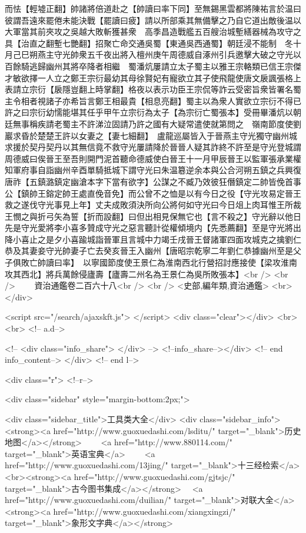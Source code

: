 而怯【輕墟正翻】帥諸將倍道赴之【帥讀曰率下同】至無錫黑雲都將陳祐言於温曰彼謂吾遠來罷倦未能決戰【罷讀曰疲】請以所部乘其無備擊之乃自它道出敵後温以大軍當其前夾攻之吳越大敗斬獲甚衆　高季昌造戰艦五百艘治城塹繕器械為攻守之具【治直之翻塹七艷翻】招聚亡命交通吳蜀【東通吳西通蜀】朝廷浸不能制　冬十月己巳朔燕主守光帥衆五千夜出將入檀州庚午周德威自涿州引兵邀擊大破之守光以百餘騎逃歸幽州其將卒降者相繼　蜀潘炕屢請立太子蜀主以雅王宗輅類已信王宗傑才敏欲擇一人立之鄭王宗衍最幼其母徐賢妃有寵欲立其子使飛龍使唐文扆諷張格上表請立宗衍【扆隱豈翻上時掌翻】格夜以表示功臣王宗侃等詐云受密旨衆皆署名蜀主令相者視諸子亦希旨言鄭王相最貴【相息亮翻】蜀主以為衆人實欲立宗衍不得已許之曰宗衍幼懦能堪其任乎甲午立宗衍為太子【為宗衍亡蜀張本】受冊畢潘炕以朝廷無事稱疾請老蜀主不許涕泣固請乃許之國有大疑常遣使就第問之　嶺南節度使劉巖求昏於楚楚王許以女妻之【妻七細翻】　盧龍巡屬皆入于晉燕主守光獨守幽州城求援於契丹契丹以其無信竟不救守光屢請降於晉晉人疑其詐終不許至是守光登城謂周德威曰俟晉王至吾則開門泥首聽命德威使白晉王十一月甲辰晉王以監軍張承業權知軍府事自詣幽州辛酉單騎抵城下謂守光曰朱温簒逆余本與公合河朔五鎮之兵興復唐祚【五鎮潞鎮定幽滄本字下當有欲字】公謀之不臧乃效彼狂僭鎮定二帥皆俛首事公【鎮帥王鎔定帥王處直俛音免】而公曾不之恤是以有今日之役【守光攻易定晉王救之遂伐守光事見上年】丈夫成敗須決所向公將何如守光曰今日俎上肉耳惟王所裁王憫之與折弓矢為誓【折而設翻】曰但出相見保無它也【言不殺之】守光辭以他日先是守光愛將李小喜多贊成守光之惡言聽計從權傾境内【先悉薦翻】至是守光將出降小喜止之是夕小喜踰城詣晉軍且言城中力竭壬戌晉王督諸軍四面攻城克之擒劉仁恭及其妻妾守光帥妻子亡去癸亥晉王入幽州【唐昭宗乾寧二年劉仁恭據幽州至是父子俱敗亡帥讀曰率】　以寧國節度使王景仁為淮南西北行營招討應接使【梁攻淮南攻其西北】將兵萬餘侵廬壽【廬壽二州名為王景仁為吳所敗張本】<br />
<br />
　　資治通鑑卷二百六十八<br />
<br />
<史部,編年類,資治通鑑>  <br>
   </div> 

<script src="/search/ajaxskft.js"> </script>
 <div class="clear"></div>
<br>
<br>
 <!-- a.d-->

 <!--
<div class="info_share">
</div> 
-->
 <!--info_share--></div>   <!-- end info_content-->
  </div> <!-- end l-->

<div class="r">   <!--r-->



<div class="sidebar"  style="margin-bottom:2px;">

 
<div class="sidebar_title">工具类大全</div>
<div class="sidebar_info">
<strong><a href="http://www.guoxuedashi.com/lsditu/" target="_blank">历史地图</a></strong>　　
<a href="http://www.880114.com/" target="_blank">英语宝典</a>　　
<a href="http://www.guoxuedashi.com/13jing/" target="_blank">十三经检索</a>　
<br><strong><a href="http://www.guoxuedashi.com/gjtsjc/" target="_blank">古今图书集成</a></strong>　
<a href="http://www.guoxuedashi.com/duilian/" target="_blank">对联大全</a>　<strong><a href="http://www.guoxuedashi.com/xiangxingzi/" target="_blank">象形文字典</a></strong>　

